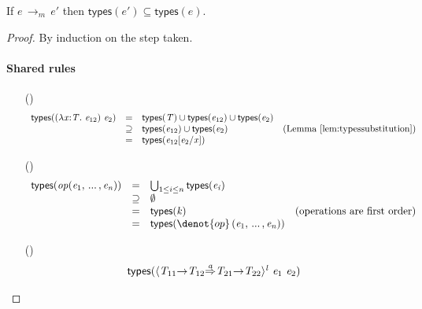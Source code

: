 \documentclass[9pt]{extarticle}
\newcommand{\ottnt}[1]{\mathit{#1}}
\newcommand{\ottmv}[1]{\mathit{#1}}
\newcommand{\ottsym}[1]{#1}
\begin{document}
\begin{lemma}
  \label{lem:typesreduction}
  If $\ottnt{e} \,  \longrightarrow _{ \ottnt{m} }  \, \ottnt{e'}$ then $  \mathsf{types} ( \ottnt{e'} )   \subseteq   \mathsf{types} ( \ottnt{e} )  $.
\begin{proof}
    By induction on the step taken.
{\iffull
    \paragraph{Shared rules}
    \begin{itemize}
    \item[(\E{Beta})] \[ \begin{array}{rclr}
         \mathsf{types} (   (  \lambda \mathit{x} \mathord{:} \ottnt{T} .~  \ottnt{e_{{\mathrm{12}}}}  )  ~ \ottnt{e_{{\mathrm{2}}}}  )  &=&    \mathsf{types} ( \ottnt{T} )   \cup   \mathsf{types} ( \ottnt{e_{{\mathrm{12}}}} )    \cup   \mathsf{types} ( \ottnt{e_{{\mathrm{2}}}} )   & \\
        &\supseteq&   \mathsf{types} ( \ottnt{e_{{\mathrm{12}}}} )   \cup   \mathsf{types} ( \ottnt{e_{{\mathrm{2}}}} )   & \text{(Lemma~\ref{lem:typessubstitution})} \\
        &=&  \mathsf{types} (  \ottnt{e_{{\mathrm{12}}}}  [  \ottnt{e_{{\mathrm{2}}}} / \mathit{x}  ]  ) 
      \end{array} \]
    \item[(\E{Op})] \[ \begin{array}{rclr}
         \mathsf{types} ( \ottnt{op}  \ottsym{(}  \ottnt{e_{{\mathrm{1}}}}  \ottsym{,} \, ... \, \ottsym{,}  \ottnt{e_{\ottmv{n}}}  \ottsym{)} )  &=& \bigcup_{1 \le i \le n}  \mathsf{types} ( \ottnt{e_{\ottmv{i}}} )  & \\
        &\supseteq&  \emptyset  & \\
        &=&  \mathsf{types} ( \ottnt{k} )  & \text{(operations are first order)} \\
        &=&  \mathsf{types} ( \denot{ op } \, \ottsym{(}  \ottnt{e_{{\mathrm{1}}}}  \ottsym{,} \, ... \, \ottsym{,}  \ottnt{e_{\ottmv{n}}}  \ottsym{)} ) 
      \end{array} \]
    \item[(\E{Unwrap})] \[ \begin{array}{@{~~}cl}
        \multicolumn{2}{l}{ \mathsf{types} (  \langle   \ottnt{T_{{\mathrm{11}}}} \mathord{ \rightarrow } \ottnt{T_{{\mathrm{12}}}}   \mathord{ \overset{ \ottnt{a} }{\Rightarrow} }   \ottnt{T_{{\mathrm{21}}}} \mathord{ \rightarrow } \ottnt{T_{{\mathrm{22}}}}   \rangle^{ \ottnt{l} } ~   \ottnt{e_{{\mathrm{1}}}} ~ \ottnt{e_{{\mathrm{2}}}}   ) } \\

\end{array}\]
\end{itemize}}
\end{proof}
\end{lemma}
\end{document}

